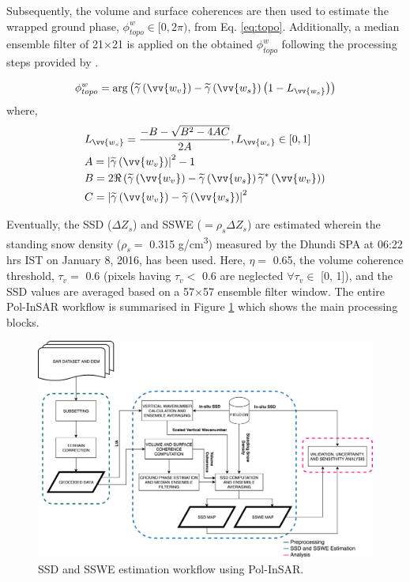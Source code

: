 \documentclass[review]{elsarticle}
\numberwithin{equation}{section}
\numberwithin{figure}{section}
\numberwithin{table}{section}
\begin{document}
Subsequently, the volume and surface coherences are then used to estimate the wrapped ground phase, $\phi_{topo}^w \in [0, 2\pi)$, from Eq. \eqref{eq:topo}. Additionally, a median ensemble filter of 21$\times$21 is applied on the obtained $\phi_{topo}^w$ following the processing steps provided by \cite{Cloude2005}.

\begin{equation}
    \label{eq:topo}
    \phi_{topo}^w = \arg\left(\widetilde{\gamma}\left(\vv{w_v}\right) - \widetilde{\gamma}\left(\vv{w_s}\right)\left(1 - L_{\vv{w_s}}\right)\right)
\end{equation}
where,
\begin{align*}
    & L_{\vv{w_s}} = \frac{-B - \sqrt{B^2 - 4AC}}{2A}, L_{\vv{w_s}} \in [0, 1] \\
    & A = \left\lvert\widetilde{\gamma}\left(\vv{w_v}\right)\right\rvert^2 - 1 \\
    & B = 2\Re\left(\widetilde{\gamma}\left(\vv{w_v}\right) - \widetilde{\gamma}\left(\vv{w_s}\right)\widetilde{\gamma}^*\left(\vv{w_v}\right)\right) \\
    & C = \left\lvert\widetilde{\gamma}\left(\vv{w_v}\right) - \widetilde{\gamma}\left(\vv{w_s}\right)\right\rvert^2
\end{align*}

Eventually, the SSD ($\Delta{Z_s}$) and SSWE ($=\rho_s\Delta{Z_s}$) are estimated wherein the standing snow density ($\rho_s = $ 0.315 g/cm\textsuperscript{3}) measured by the Dhundi SPA at 06:22 hrs IST on January 8, 2016, has been used. Here, $\eta = $ 0.65, the volume coherence threshold, $\tau_v = $ 0.6 (pixels having $\tau_v < $ 0.6 are neglected $\forall\tau_v \in$ [0, 1]), and the SSD values are averaged based on a 57$\times$57 ensemble filter window. The entire Pol-InSAR workflow is summarised in Figure \ref{fig:ssd_method} which shows the main processing blocks.

\begin{figure}[htb]
    \centering
    \includegraphics[width=\textwidth]{Figures/Methods/SSD_Method.png}
    \caption{SSD and SSWE estimation workflow using Pol-InSAR.}
    \label{fig:ssd_method}
\end{figure}
\end{document}
